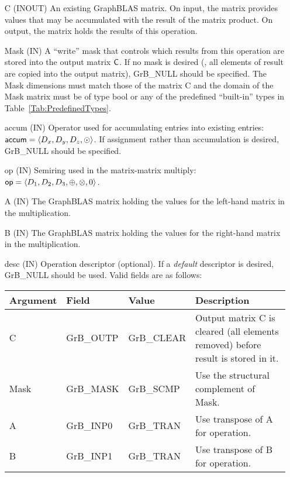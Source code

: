 \begin{itemize}[leftmargin=1.1in]
    \item[{\sf C}]    ({\sf INOUT}) An existing GraphBLAS matrix. On
    input, the matrix provides values that may be accumulated with the
    result of the matrix product.   On output, the matrix holds the
    results of this operation.

    \item[{\sf Mask}] ({\sf IN}) A ``write'' mask that controls which
    results from this operation are stored into the output matrix ${\sf
    C}$.  If no mask is desired (\ie, all elements of result are copied
    into the output matrix), {\sf GrB\_NULL} should be specified. The
    Mask dimensions must match those of the matrix {\sf C} and the domain
    of the {\sf Mask} matrix must be of type {\sf bool} or any of the
    predefined ``built-in'' types in Table~\ref{Tab:PredefinedTypes}.

    \item[{\sf accum}] ({\sf IN}) Operator used for accumulating entries
    into existing  entries: ${\sf accum} = \langle D_x,
    D_y, D_z,\odot \rangle$. If assignment rather than accumulation is
    desired, {\sf GrB\_NULL} should be specified.

    \item[{\sf op}] ({\sf IN}) Semiring used in the matrix-matrix
    multiply: ${\sf op}=\langle D_1,D_2,D_3,\oplus,\otimes,0 \rangle$.

    \item[{\sf A}] ({\sf IN}) The GraphBLAS matrix holding the values
    for the left-hand matrix in the multiplication.

    \item[{\sf B}] ({\sf IN}) The GraphBLAS matrix holding the values
    for the right-hand matrix in the multiplication.

    \item[{\sf desc}] ({\sf IN}) Operation descriptor (optional). If
    a \emph{default} descriptor is desired, {\sf GrB\_NULL} should be
    used. Valid fields are as follows: 

    \begin{tabular}{lllp{2.75in}}
    Argument   & Field           & Value             & Description \\ \hline
    {\sf C}    & {\sf GrB\_OUTP} & {\sf GrB\_CLEAR}  & Output matrix {\sf C} is cleared (all elements removed) before result is stored in it. \\
    {\sf Mask} & {\sf GrB\_MASK} & {\sf GrB\_SCMP}   & Use the structural complement of {\sf Mask}. \\
    {\sf A}    & {\sf GrB\_INP0} & {\sf GrB\_TRAN}   & Use transpose of {\sf A} for operation. \\
    {\sf B}    & {\sf GrB\_INP1} & {\sf GrB\_TRAN}   & Use transpose of {\sf B} for operation. \\
    \end{tabular}
\end{itemize}

